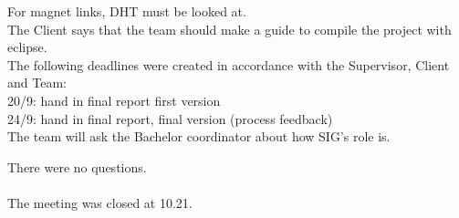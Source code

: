 \begin{enumerate}
For magnet links, DHT must be looked at.\\

The Client says that the team should make a guide to compile the project with eclipse.\\

The following deadlines were created in accordance with the Supervisor, Client and Team:\\
20/9: hand in final report first version\\
24/9: hand in final report, final version (process feedback)\\

The team will ask the Bachelor coordinator about how SIG's role is.\\
\end{enumerate}

\noindent There were no questions.\\
\mbox{}\\
The meeting was closed at 10.21.\\